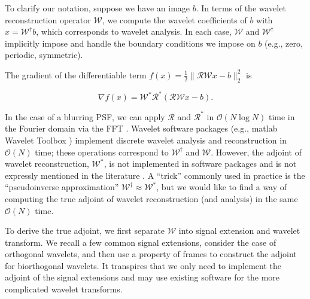 \documentclass[journal]{IEEEtran}
\begin{document}
To clarify our notation, suppose we have an image $b$.  In terms of the wavelet reconstruction operator $\mathcal{W}$, we compute the wavelet coefficients of $b$ with $x=\mathcal{W}^\dagger b$, which corresponds to wavelet analysis.  In each case, $\mathcal{W}$ and $\mathcal{W}^\dagger$ implicitly impose and handle the boundary conditions we impose on $b$ (e.g., zero, periodic, symmetric).

The gradient of the differentiable term $f(x)={\frac{1}{2}\|\mathcal{RW}x-b\|_2^2}$ is

\[ \nabla f(x) = \mathcal{W}^\ast \mathcal{R}^\ast(\mathcal{RW}x-b). \] 

\noindent In the case of a blurring PSF, we can apply $\mathcal{R}$ and $\mathcal{R}^\ast$ in $\mathcal{O}(N\log N)$ time in the Fourier domain via the FFT \cite{beck_2009, hansen_2006}.  Wavelet software packages (e.g., {\sc matlab} Wavelet Toolbox \cite{matlab_wt_2015}) implement discrete wavelet analysis and reconstruction in $\mathcal{O}(N)$ time; these operations correspond to $\mathcal{W}^\dagger$ and $\mathcal{W}$.  However, the adjoint of wavelet reconstruction, $\mathcal{W}^\ast$, is not implemented in software packages and is not expressly mentioned in the literature \cite{mallat_2009, strang_1996}.  A ``trick'' commonly used in practice is the ``pseudoinverse approximation'' $\mathcal{W}^\dagger\approx\mathcal{W}^\ast$, but we would like to find a way of computing the true adjoint of wavelet reconstruction (and analysis) in the same $\mathcal{O}(N)$ time. 



To derive the true adjoint, we first separate $\mathcal{W}$ into signal extension and wavelet transform.  We recall a few common signal extensions, consider the case of orthogonal wavelets, and then use a property of frames to construct the adjoint for biorthogonal wavelets.  It transpires that we only need to implement the adjoint of the signal extensions and may use existing software for the more complicated wavelet transforms.
\end{document}
